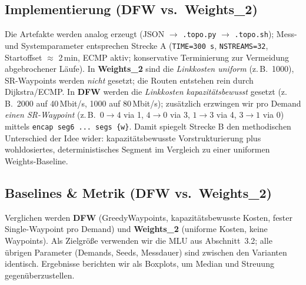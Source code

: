\documentclass[sigconf,nonacm,review]{acmart}
\begin{document}
\subsection{Implementierung (DFW vs.\ Weights\_2)}
Die Artefakte werden analog erzeugt (JSON $\to$ \texttt{.topo.py} $\to$ \texttt{.topo.sh}); Mess- und
Systemparameter entsprechen Strecke A (\texttt{TIME=300\,s}, \texttt{NSTREAMS=32}, Startoffset $\approx$ 2\,min,
ECMP aktiv; konservative Terminierung zur Vermeidung abgebrochener Läufe). In \textbf{Weights\_2} sind die
\emph{Linkkosten uniform} (z.\,B.\ 1000), SR-Waypoints werden \emph{nicht} gesetzt; die Routen entstehen
rein durch Dijkstra/ECMP. In \textbf{DFW} werden die \emph{Linkkosten kapazitätsbewusst} gesetzt (z.\,B.\ 2000
auf 40\,Mbit/s, 1000 auf 80\,Mbit/s); zusätzlich erzwingen wir pro Demand \emph{einen SR-Waypoint}
(z.\,B.\ $0\!\to\!4$ via 1, $4\!\to\!0$ via 3, $1\!\to\!3$ via 4, $3\!\to\!1$ via 0) mittels
\texttt{encap seg6 ... segs \{w\}}. Damit spiegelt Strecke B den methodischen Unterschied der Idee wider:
kapazitätsbewusste Vorstrukturierung plus wohldosiertes, deterministisches Segment im Vergleich zu einer
uniformen Weights-Baseline.

\subsection{Baselines \& Metrik (DFW vs.\ Weights\_2)}
Verglichen werden \textbf{DFW} (GreedyWaypoints, kapazitätsbewusste Kosten, fester Single-Waypoint pro Demand)
und \textbf{Weights\_2} (uniforme Kosten, keine Waypoints). Als Zielgröße verwenden wir die MLU aus Abschnitt~3.2;
alle übrigen Parameter (Demands, Seeds, Messdauer) sind zwischen den Varianten identisch. Ergebnisse berichten wir
als Boxplots, um Median und Streuung gegenüberzustellen.
\end{document}
